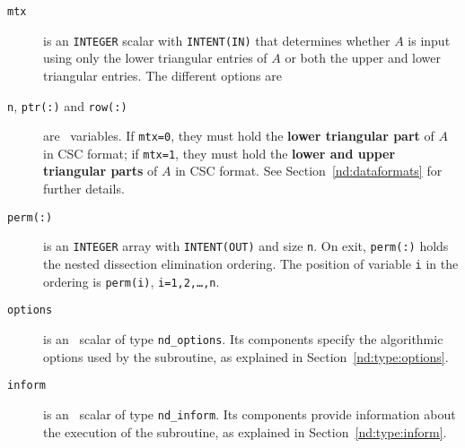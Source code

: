 \noindent
\begin{description}

\item[\texttt{mtx}] is an {\tt INTEGER} scalar with {\tt INTENT(IN)} that 
determines whether $A$ is input using only the lower triangular entries 
of $A$ or both the upper and lower triangular entries. The different options are 

\item[\texttt{n}, \texttt{ptr(:)} and \texttt{row(:)}] are \intentin\ variables. 
If {\tt mtx=0}, they must hold the \textbf{lower triangular part} of 
$A$ in CSC format;  if {\tt mtx=1}, they 
must hold the \textbf{lower and upper triangular parts} of $A$ in CSC format. 
See Section~\ref{nd:dataformats} for further details.




\item[\texttt{perm(:)}] is an {\tt INTEGER} array with {\tt INTENT(OUT)} and size
{\tt n}.  On exit, {\tt perm(:)} holds the nested dissection elimination ordering. 
The position of variable {\tt i} in the ordering is  {\tt perm(i)},
{\tt i=1,2,\ldots,n}.


\item[\texttt{options}] is an \intentin\ scalar of type {\tt nd\_options}.
Its components specify the algorithmic options used by the subroutine, as
explained in Section~\ref{nd:type:options}.

\item[\texttt{inform}] is an \intentout\ scalar of type
{\tt nd\_inform}. Its components provide information about the execution
of the subroutine, as explained in Section~\ref{nd:type:inform}.


\end{description}
